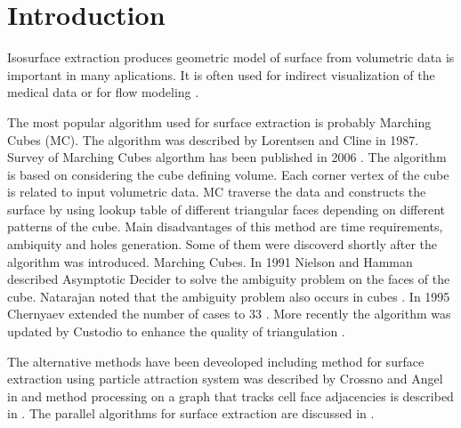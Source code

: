 \section{Introduction}\label{sec:intro}


Isosurface extraction produces geometric model of surface 
 from volumetric data is important in many aplications. It is often used for indirect visualization of the medical data or for flow modeling \cite{Rohan2018a}.
 
 
The most popular algorithm used for surface extraction is probably Marching Cubes (MC). The algorithm was described by Lorentsen and Cline \cite{Lorensen1987} in 1987. Survey of Marching Cubes algorthm has been published in 2006 \cite{Newman2006}. The algorithm is based on considering the cube defining volume. Each corner vertex of the cube is related to input volumetric data. MC traverse the data and constructs the surface by using lookup table of different triangular faces depending on different patterns of the cube.  Main disadvantages of this method are time requirements, ambiquity and holes generation. Some of them were discoverd shortly after the algorithm was introduced. 
Marching Cubes. In 1991 Nielson and Hamman described Asymptotic Decider to solve the ambiguity problem on the faces of the cube.  Natarajan noted that the ambiguity problem also occurs in cubes \cite{Natarajan1994}. In 1995 Chernyaev extended the number of cases to 33 \cite{chernyaev1995marching}. More recently the algorithm was updated by Custodio to   enhance the quality of triangulation \cite{Custodio2019}. 

The alternative methods have been deveoloped including method for surface extraction using particle attraction system was described by Crossno and Angel in \cite{Crossno2002} and method processing on a graph that tracks cell face adjacencies is described in \cite{Lachaud2000}. The parallel algorithms for surface extraction are discussed in \cite{Bajaj2004}.




